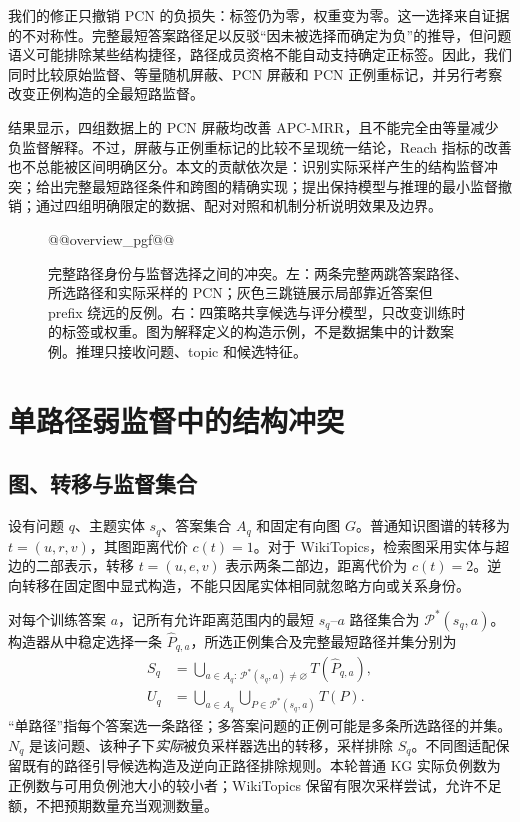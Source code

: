 \documentclass[UTF8,a4paper,10pt,fontset=fandol]{ctexart}
\begin{document}
我们的修正只撤销 PCN 的负损失：标签仍为零，权重变为零。这一选择来自证据的不对称性。完整最短答案路径足以反驳“因未被选择而确定为负”的推导，但问题语义可能排除某些结构捷径，路径成员资格不能自动支持确定正标签。因此，我们同时比较原始监督、等量随机屏蔽、PCN 屏蔽和 PCN 正例重标记，并另行考察改变正例构造的全最短路监督。

结果显示，四组数据上的 PCN 屏蔽均改善 APC-MRR，且不能完全由等量减少负监督解释。不过，屏蔽与正例重标记的比较不呈现统一结论，Reach 指标的改善也不总能被区间明确区分。本文的贡献依次是：识别实际采样产生的结构监督冲突；给出完整最短路径条件和跨图的精确实现；提出保持模型与推理的最小监督撤销；通过四组明确限定的数据、配对对照和机制分析说明效果及边界。

\begin{figure}[tbp]
\centering
\begin{lrbox}{\pcnfigurebox}
@@overview_pgf@@
\end{lrbox}\resizebox{\linewidth}{!}{\usebox{\pcnfigurebox}}
\caption{完整路径身份与监督选择之间的冲突。左：两条完整两跳答案路径、所选路径和实际采样的 PCN；灰色三跳链展示局部靠近答案但 prefix 绕远的反例。右：四策略共享候选与评分模型，只改变训练时的标签或权重。图为解释定义的构造示例，不是数据集中的计数案例。推理只接收问题、topic 和候选特征。}\label{fig:overview}
\end{figure}

\section{单路径弱监督中的结构冲突}
\subsection{图、转移与监督集合}
设有问题 $q$、主题实体 $s_q$、答案集合 $A_q$ 和固定有向图 $G$。普通知识图谱的转移为 $t=(u,r,v)$，其图距离代价 $c(t)=1$。对于 WikiTopics，检索图采用实体与超边的二部表示，转移 $t=(u,e,v)$ 表示两条二部边，距离代价为 $c(t)=2$。逆向转移在固定图中显式构造，不能只因尾实体相同就忽略方向或关系身份。

对每个训练答案 $a$，记所有允许距离范围内的最短 $s_q$--$a$ 路径集合为 $\mathcal P^*(s_q,a)$。构造器从中稳定选择一条 $\widehat P_{q,a}$，所选正例集合及完整最短路径并集分别为
\begin{align}
S_q &= \bigcup_{a\in A_q:\,\mathcal P^*(s_q,a)\ne\varnothing} T(\widehat P_{q,a}),\\
U_q &= \bigcup_{a\in A_q} \bigcup_{P\in\mathcal P^*(s_q,a)}T(P).
\end{align}
“单路径”指每个答案选一条路径；多答案问题的正例可能是多条所选路径的并集。$N_q$ 是该问题、该种子下\emph{实际}被负采样器选出的转移，采样排除 $S_q$。不同图适配保留既有的路径引导候选构造及逆向正路径排除规则。本轮普通 KG 实际负例数为正例数与可用负例池大小的较小者；WikiTopics 保留有限次采样尝试，允许不足额，不把预期数量充当观测数量。
\end{document}
